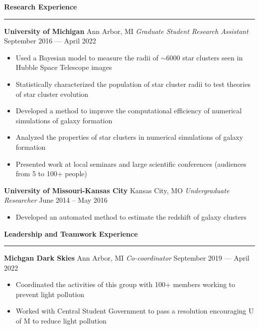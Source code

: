 \documentclass[10pt]{article}
\newcommand{\header}[1]{\vspace{1.0em}\par \textbf{\large #1}\strut\hrule\vspace{-0.9em}}
\newcommand{\actionHeader}[2]{\vspace{0.6em}\textbf{#1} \hfill #2}
\newcommand{\actionHeaderSecondLine}[2]{\newline \textit{#1} \hfill #2}
\begin{document}
\header{Research Experience}
\actionHeader{University of Michigan}{Ann Arbor, MI}
\actionHeaderSecondLine{Graduate Student Research Assistant}{September 2016 --- April 2022}
\begin{itemize}
    \item Used a Bayesian model to measure the radii of $\sim$6000 star clusters seen in Hubble Space Telescope images 
    \item Statistically characterized the population of star cluster radii to test theories of star cluster evolution
    \item Developed a method to improve the computational efficiency of numerical simulations of galaxy formation
    \item Analyzed the properties of star clusters in numerical simulations of galaxy formation
    \item Presented work at local seminars and large scientific conferences (audiences from 5 to 100+ people)
\end{itemize}

\actionHeader{University of Missouri-Kansas City}{Kansas City, MO}
\actionHeaderSecondLine{Undergraduate Researcher}{June 2014 -- May 2016} 
\begin{itemize}
    \item Developed an automated method to estimate the redshift of galaxy clusters
\end{itemize}

\header{Leadership and Teamwork Experience}
\actionHeader{Michgan Dark Skies}{Ann Arbor, MI}
\actionHeaderSecondLine{Co-coordinator}{September 2019 --- April 2022}
\begin{itemize}
    \item Coordinated the activities of this group with 100+ members working to prevent light pollution
    \item Worked with Central Student Government to pass a resolution encouraging U of M to reduce light pollution
\end{itemize}
\end{document}
